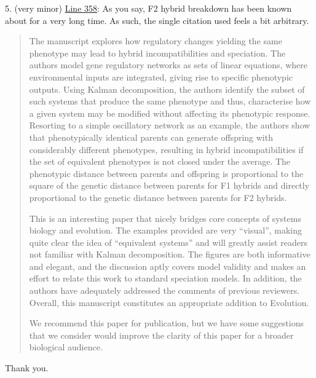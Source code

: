 \reply{
}

\begin{point}{}
  5. (very minor) \hyperlink{rev1:6}{Line 358}: As you say, F2 hybrid breakdown has been known about for a very long time. As such, the single citation used feels a bit arbitrary.
\end{point}

\reply{
}

\begin{quote}
The manuscript explores how regulatory changes yielding the same phenotype may lead to hybrid incompatibilities and speciation. The authors model gene regulatory networks as sets of linear equations, where environmental inputs are integrated, giving rise to specific phenotypic outputs. Using Kalman decomposition, the authors identify the subset of such systems that produce the same phenotype and thus, characterise how a given system may be modified without affecting its phenotypic response. Resorting to a simple oscillatory network as an example, the authors show that phenotypically identical parents can generate offspring with considerably different phenotypes, resulting in hybrid incompatibilities if the set of equivalent phenotypes is not closed under the average. The phenotypic distance between parents and offspring is proportional to the square of the genetic distance between parents for F1 hybrids and directly proportional to the genetic distance between parents for F2 hybrids.

This is an interesting paper that nicely bridges core concepts of systems biology and evolution. The examples provided are very ``visual'', making quite clear the idea of ``equivalent systems'' and will greatly assist readers not familiar with Kalman decomposition. The figures are both informative and elegant, and the discussion aptly covers model validity and makes an effort to relate this work to standard speciation models. In addition, the authors have adequately addressed the comments of previous reviewers. Overall, this manuscript constitutes an appropriate addition to Evolution.

We recommend this paper for publication, but we have some suggestions that we consider would improve the clarity of this paper for a broader biological audience.
\end{quote}

Thank you. 

